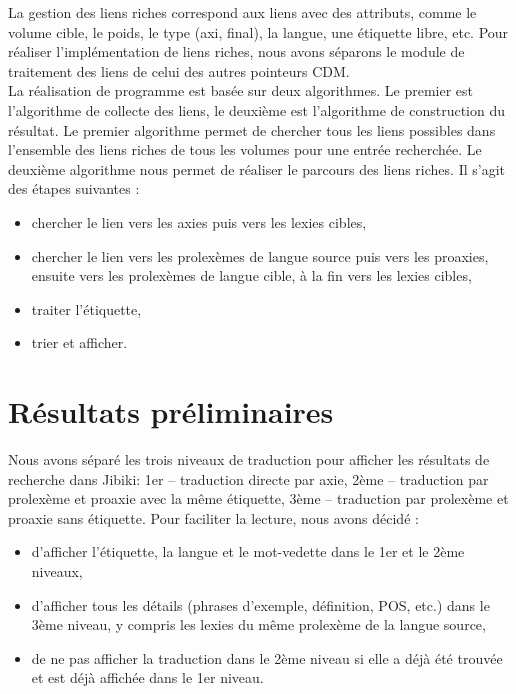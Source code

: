 \documentclass[10pt,a4paper,twoside]{article}
\begin{document}
La gestion des liens riches correspond aux liens avec des attributs, comme le volume cible, le poids, le type (axi, final), la langue, une étiquette libre, etc. Pour réaliser l'implémentation de liens riches, nous avons séparons le module de traitement des liens de celui des autres pointeurs CDM. \\
La réalisation de programme est basée sur deux algorithmes. Le premier est l'algorithme de collecte des liens, le deuxième est l'algorithme de construction du résultat.  Le premier algorithme permet de chercher tous les liens possibles dans l'ensemble des liens riches de tous les volumes pour une entrée recherchée. Le deuxième algorithme nous permet de réaliser le parcours des liens riches. Il s'agit des étapes suivantes :
\begin{itemize}
\item chercher le lien vers les axies puis vers les lexies cibles,
\item chercher le lien vers les prolexèmes de langue source puis vers les proaxies, ensuite vers les prolexèmes de langue cible, à la fin vers les lexies cibles,
\item traiter l'étiquette,
\item trier et afficher.
\end{itemize}


\section{Résultats préliminaires}

Nous avons séparé les trois niveaux de traduction pour afficher les résultats de recherche dans Jibiki: 1er – traduction directe par axie, 2ème – traduction par prolexème et proaxie avec la même étiquette, 3ème – traduction par prolexème et proaxie sans étiquette.  Pour faciliter la lecture, nous avons décidé :
\begin{itemize}
\item d'afficher l'étiquette, la langue et le mot-vedette dans le 1er et le 2ème niveaux, 
\item d'afficher tous les détails (phrases d'exemple, définition, POS, etc.) dans le 3ème niveau, y compris les lexies du même prolexème de la langue source,
\item de ne pas afficher la traduction dans le 2ème niveau si elle a déjà été trouvée et est déjà affichée dans le 1er niveau.
\end{itemize}
\end{document}
